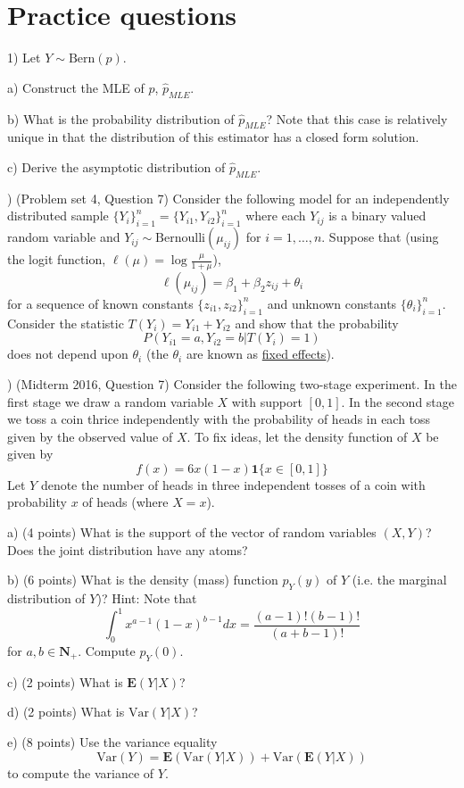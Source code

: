 \documentclass[12pt,english]{article}
\begin{document}
\section{Practice questions}

1) Let $Y \sim \text{Bern}(p)$.

a) Construct the MLE of $p$, $\widehat{p}_{MLE}$.

b) What is the probability distribution of $\widehat{p}_{MLE}$? Note that this case is relatively unique in that the distribution of this estimator has a closed form solution.

c) Derive the asymptotic distribution of $\widehat{p}_{MLE}$.

\vspace{1em}
) (Problem set 4, Question 7) Consider the following model for an independently distributed sample $\{ Y_{i} \}_{i=1}^{n} = \{ Y_{i1}, Y_{i2} \}_{i=1}^{n}$ where each $Y_{ij}$ is a binary valued random variable and $Y_{ij} \sim \text{Bernoulli}(\mu_{ij})$ for $i = 1, \ldots, n$. Suppose that (using the logit function, $\ell(\mu) = \log \frac{\mu}{1 + \mu}$),
$$ \ell(\mu_{ij}) = \beta_{1} + \beta_{2} z_{ij} + \theta_{i} $$
for a sequence of known constants $\{ z_{i1}, z_{i2} \}_{i=1}^{n}$ and unknown constants $\{\theta_{i}\}_{i=1}^{n}$. Consider the statistic $T(Y_{i}) = Y_{i1} + Y_{i2}$ and show that the probability
$$ P(Y_{i1} = a, Y_{i2} = b | T(Y_{i}) = 1) $$
does not depend upon $\theta_{i}$ (the $\theta_{i}$ are known as \underline{fixed effects}).

\vspace{1em}
) (Midterm 2016, Question 7) Consider the following two-stage experiment.  In the first stage we draw a random variable $X$ with support $[0,1]$.  In the second stage we toss a coin thrice independently with the probability of heads in each toss given by the observed value of $X$. To fix ideas, let the density function of $X$ be given by
$$f(x) = 6x(1 - x) \mathbf{1} \{ x \in [0, 1] \}$$
Let $Y$ denote the number of heads in three independent tosses of a coin with probability $x$ of heads (where $X = x$).

a) (4 points)  What is the support of the vector of random variables $(X,Y)$?  Does the joint distribution have any atoms?

b) (6 points)  What is the density (mass) function $p_{Y}(y)$ of $Y$ (i.e.  the marginal distribution of $Y$)? Hint: Note that
$$ \int_{0}^{1} x^{a-1}(1-x)^{b-1}dx = \frac{(a-1)!(b-1)!}{(a + b - 1)!} $$
for $a, b \in \mathbf{N}_{+}$. Compute $p_{Y}(0)$.

c) (2 points) What is $\mathbf{E}(Y|X)$?

d) (2 points) What is $\text{Var}(Y|X)$?

e) (8 points) Use the variance equality
$$ \text{Var}(Y) = \mathbf{E}(\text{Var}(Y|X)) + \text{Var}(\mathbf{E}(Y|X)) $$
to compute the variance of $Y$.
\end{document}
